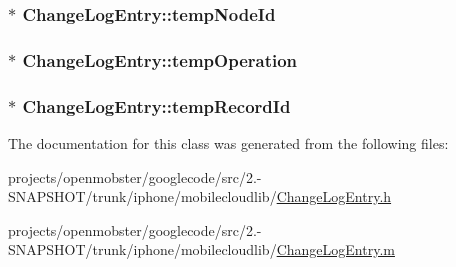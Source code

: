 \label{interface_change_log_entry_aaee4caa1d7dc9d8facf2babcd498fbbc}
\hypertarget{interface_change_log_entry_a6c9aaabba3901d8deadaeac3b32eaa34}{
\subsubsection[{temp\-Node\-Id}]{ $\ast$ \-Change\-Log\-Entry\-::temp\-Node\-Id}}
\label{interface_change_log_entry_a6c9aaabba3901d8deadaeac3b32eaa34}
\hypertarget{interface_change_log_entry_ad66e615443cd07dbe88b2d6e56d63258}{
\subsubsection[{temp\-Operation}]{ $\ast$ \-Change\-Log\-Entry\-::temp\-Operation}}
\label{interface_change_log_entry_ad66e615443cd07dbe88b2d6e56d63258}
\hypertarget{interface_change_log_entry_a6f640615260a2047d74e4c35e005a5c8}{
\subsubsection[{temp\-Record\-Id}]{ $\ast$ \-Change\-Log\-Entry\-::temp\-Record\-Id}}
\label{interface_change_log_entry_a6f640615260a2047d74e4c35e005a5c8}


\-The documentation for this class was generated from the following files\-:\begin{DoxyCompactItemize}
\item 
projects/openmobster/googlecode/src/2.-\/\-S\-N\-A\-P\-S\-H\-O\-T/trunk/iphone/mobilecloudlib/\hyperlink{_change_log_entry_8h}{\-Change\-Log\-Entry.\-h}\item 
projects/openmobster/googlecode/src/2.-\/\-S\-N\-A\-P\-S\-H\-O\-T/trunk/iphone/mobilecloudlib/\hyperlink{_change_log_entry_8m}{\-Change\-Log\-Entry.\-m}\end{DoxyCompactItemize}
